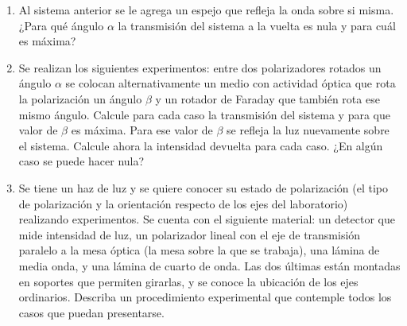 \documentclass[11pt,spanish,a4paper]{article}
\begin{document}
\begin{enumerate}
\item Al sistema anterior se le agrega un espejo que refleja la onda sobre si misma.
¿Para qué ángulo \( \alpha \) la transmisión del sistema a la vuelta es nula y para cuál es máxima?


\item Se realizan los siguientes experimentos: entre dos polarizadores rotados un ángulo \( \alpha \) se colocan alternativamente un medio con actividad óptica que rota la polarización un ángulo \( \beta \) y un rotador de Faraday que también rota ese mismo ángulo.
Calcule para cada caso la transmisión del sistema y para que valor de \( \beta \) es máxima.
Para ese valor de \( \beta \) se refleja la luz nuevamente sobre el sistema.
Calcule ahora la intensidad devuelta para cada caso.
¿En algún caso se puede hacer nula?


\item Se tiene un haz de luz y se quiere conocer su estado de polarización (el tipo de polarización y la orientación respecto de los ejes del laboratorio) realizando experimentos.
Se cuenta con el siguiente material: un detector que mide intensidad de luz, un polarizador lineal con el eje de transmisión paralelo a la mesa óptica (la mesa sobre la que se trabaja), una lámina de media onda, y una lámina de cuarto de onda.
Las dos últimas están montadas en soportes que permiten girarlas, y se conoce la ubicación de los ejes ordinarios.
Describa un procedimiento experimental que contemple todos los casos que puedan presentarse.


\end{enumerate}
\end{document}
